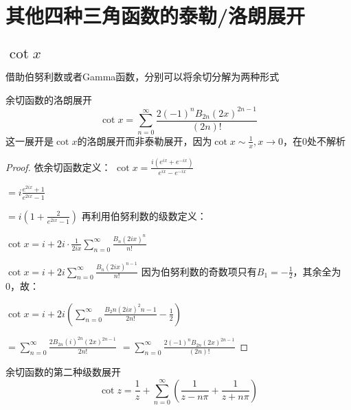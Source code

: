 \documentclass[12pt, a4paper, oneside, UTF8]{ctexbook}
\begin{document}
	\section{其他四种三角函数的泰勒/洛朗展开}
		\subsection{$\cot x$}
			借助伯努利数或者Gamma函数，分别可以将余切分解为两种形式
			\begin{them}{余切函数的洛朗展开}{}
				\begin{equation}
					\cot x = \sum\limits_{n=0}^{\infty}\frac{2(-1)^n B_{2n} (2x)^{2n-1}}{(2n)!}
				\end{equation}
				这一展开是$\cot x$的洛朗展开而非泰勒展开，因为$\cot x \sim \frac{1}{x},x\to 0$，在0处不解析
			\end{them}
			\begin{proof}
				依余切函数定义：
				$\cot x = \frac{i(e^{ix}+e^{-ix})}{e^{ix}-e^{-ix}}$
				
				$=i\frac{e^{2ix}+1}{e^{2ix}-1}$
				
				$=i\left(1+\frac{2}{e^{2ix}-1}\right)$
				再利用伯努利数的级数定义：
				
				$\cot x = i+2i\cdot \frac{1}{2ix} \sum\limits_{n=0}^{\infty} \frac{B_n (2ix)^n}{n!}$
				
				$\cot x = i+2i\sum\limits_{n=0}^{\infty} \frac{B_n (2ix)^{n-1}}{n!}$
				因为伯努利数的奇数项只有$B_1=-\frac{1}{2}$，其余全为0，故：
				
				$\cot x = i+2i\left(\sum_{n=0}^{\infty} \frac{B_2n (2ix)^2n-1}{2n!} -\frac{1}{2}\right)$
				
				$=\sum\limits_{n=0}^{\infty} \frac{2 B_{2n} (i)^{2n} (2x)^{2n-1}}{2n!}$
				$=\sum\limits_{n=0}^{\infty}\frac{2(-1)^n B_{2n} (2x)^{2n-1}}{(2n)!}$
			\end{proof}
			\begin{them}{余切函数的第二种级数展开}{}
				\begin{equation}
					\cot z = \frac{1}{z}+\sum\limits_{n=0}^{\infty} \left(\frac{1}{z-n\pi}+\frac{1}{z+n\pi}\right)
				\end{equation}
			\end{them}
\end{document}
